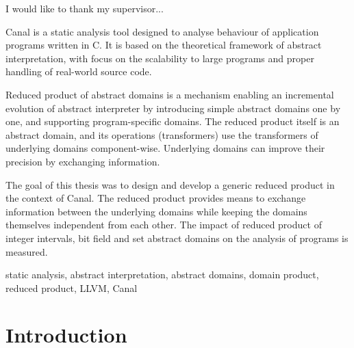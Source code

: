 \documentclass[12pt,oneside]{fithesis2}
\theoremstyle{definition}
\begin{document}
\FrontMatter
\ThesisTitlePage

\begin{ThesisDeclaration}
\DeclarationText
\AdvisorName
\end{ThesisDeclaration}

\begin{ThesisThanks}
I would like to thank my supervisor...
\end{ThesisThanks}

\begin{ThesisAbstract}
Canal is a static analysis tool designed to analyse behaviour of application programs written in C. It is based on the theoretical framework of abstract interpretation, with focus on the scalability to large programs and proper handling of real-world source code.

Reduced product of abstract domains is a mechanism enabling an incremental evolution of abstract interpreter by introducing simple abstract domains one by one, and supporting program-specific domains. The reduced product itself is an abstract domain, and its operations (transformers) use the transformers of underlying domains component-wise. Underlying domains can improve their precision by exchanging information.

The goal of this thesis was to design and develop a generic reduced product in the context of Canal. The reduced product provides means to exchange information between the underlying domains while keeping the domains themselves independent from each other. The impact of reduced product of integer intervals, bit field and set abstract domains on the analysis of programs is measured.
\end{ThesisAbstract}

\begin{ThesisKeyWords}
static analysis, abstract interpretation, abstract domains, domain product, reduced product, LLVM, Canal
\end{ThesisKeyWords}

\tableofcontents

\MainMatter
\chapter{Introduction}
\end{document}
